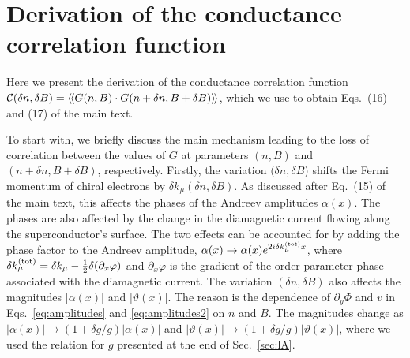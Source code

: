\documentclass[pra,aps,a4paper,twocolumn,superscriptaddress,longbibliography]{revtex4-2}
\newcommand{\rngl}{\rangle\hspace{-0.05cm}\rangle}
\newcommand{\lngl}{\langle\hspace{-0.05cm}\langle}
\begin{document}
\section{Derivation of the conductance correlation function\label{sec:condcorrf}}

Here we present the derivation of the conductance correlation function ${\cal C}(\delta n, \delta B) = \lngl G(n, B) \cdot G(n + \delta n, B + \delta B) \rngl$,
which we use to obtain Eqs.~(16) and (17) of the main text.

To start with, we briefly discuss the main mechanism leading to the loss of correlation between the values of $G$ at parameters $(n, B)$ and $(n + \delta n, B + \delta B)$, respectively. Firstly, the variation $(\delta n, \delta B$) shifts the Fermi momentum of chiral electrons by $\delta k_\mu(\delta n, \delta B)$. As discussed after Eq.~(15) of the main text, this affects the phases of the Andreev amplitudes $\alpha(x)$. The phases are also affected by the change in the diamagnetic current flowing along the superconductor's surface.
The two effects can be accounted for by adding the phase factor to the Andreev amplitude, $\alpha (x) \rightarrow \alpha(x) e^{2i\delta k^{\rm (tot)}_{\mu} x}$, where $\delta k^{\rm (tot)}_{\mu} = \delta k_\mu  - \frac{1}{2} \delta (\partial_x \varphi)$ and $\partial_x \varphi$ is the gradient of the order parameter phase associated with the diamagnetic current. The variation $(\delta n, \delta B)$ also affects the magnitudes $|\alpha(x)|$ and $|\vartheta(x)|$. 
The reason is the dependence of $\partial_y \Phi$ and $v$ in Eqs.~\eqref{eq:amplitudes} and \eqref{eq:amplitudes2} on $n$ and $B$.
The magnitudes change as $|\alpha(x)| \rightarrow (1 + \delta g / g) |\alpha(x)|$ and $|\vartheta(x)| \rightarrow (1 + \delta g / g) |\vartheta(x)|$, where we used the relation for $g$ presented at the end of Sec.~\ref{sec:lA}.
\end{document}
